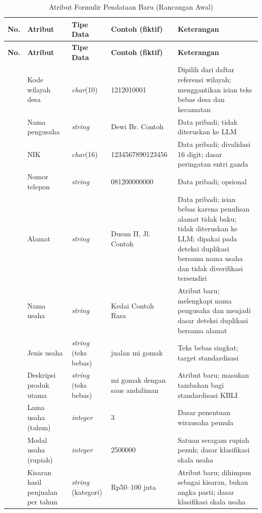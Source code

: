 {\footnotesize
\setlength{\tabcolsep}{4pt}
\renewcommand{\arraystretch}{1.15}
\begin{longtable}{|>{\centering\arraybackslash}p{}|L{0.19\textwidth}|L{0.12\textwidth}|L{0.21\textwidth}|L{0.32\textwidth}|}
\caption{Atribut Formulir Pendataan Baru (Rancangan Awal)}
\label{tab:formulir}\\
\hline
\textbf{No.} & \textbf{Atribut} & \textbf{Tipe Data} & \textbf{Contoh (fiktif)} & \textbf{Keterangan} \\ \hline
\endfirsthead
\hline
\textbf{No.} & \textbf{Atribut} & \textbf{Tipe Data} & \textbf{Contoh (fiktif)} & \textbf{Keterangan} \\ \hline
{} & Kode wilayah desa & \textit{char}(10) & 1212010001 & Dipilih dari daftar referensi wilayah; menggantikan isian teks bebas desa dan kecamatan \\  & Nama pengusaha & \textit{string} & Dewi Br. Contoh & Data pribadi; tidak diteruskan ke LLM \\  & NIK & \textit{char}(16) & 1234567890123456 & Data pribadi; divalidasi 16 digit; dasar peringatan entri ganda \\  & Nomor telepon & \textit{string} & 081200000000 & Data pribadi; opsional \\  & Alamat & \textit{string} & Dusun II, Jl. Contoh & Data pribadi; isian bebas karena penulisan alamat tidak baku; tidak diteruskan ke LLM; dipakai pada deteksi duplikasi bersama nama usaha dan tidak diverifikasi tersendiri \\  & Nama usaha & \textit{string} & Kedai Contoh Rasa & Atribut baru; melengkapi nama pengusaha dan menjadi dasar deteksi duplikasi bersama alamat \\  & Jenis usaha & \textit{string} (teks bebas) & jualan mi gomak & Teks bebas singkat; target standardisasi \\  & Deskripsi produk utama & \textit{string} (teks bebas) & mi gomak dengan saus andaliman & Atribut baru; masukan tambahan bagi standardisasi KBLI \\  & Lama usaha (tahun) & \textit{integer} & 3 & Dasar penentuan wirausaha pemula \\  & Modal usaha (rupiah) & \textit{integer} & 2500000 & Satuan seragam rupiah penuh; dasar klasifikasi skala usaha \\  & Kisaran hasil penjualan per tahun & \textit{string} (kategori) & Rp50--100 juta & Atribut baru; dihimpun sebagai kisaran, bukan angka pasti; dasar klasifikasi skala usaha \\ \hline

\end{longtable}}
